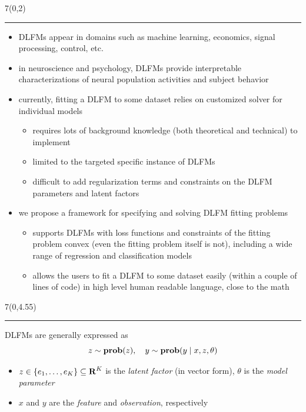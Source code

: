 \documentclass[a0]{a0poster}
\begin{document}
\begin{textblock}{7}(0,2)
    \hrule\vspace*{0.5\baselineskip}
    \begin{itemize}
        \item DLFMs appear in domains such as machine learning, economics, signal processing, control, etc.
        \item in neuroscience and psychology, DLFMs provide interpretable characterizations of neural population activities and subject behavior
        \item currently, fitting a DLFM to some dataset relies on customized solver for individual models
            \begin{itemize}
                \item requires lots of background knowledge (both theoretical and technical) to implement
                \item limited to the targeted specific instance of DLFMs
                \item difficult to add regularization terms and constraints on the DLFM parameters and latent factors
            \end{itemize}
        \item we propose a framework for specifying and solving DLFM fitting problems
            \begin{itemize}
                \item supports DLFMs with loss functions and constraints of the fitting problem convex (even the fitting problem itself is not), including a wide range of regression and classification models
                \item allows the users to fit a DLFM to some dataset easily (within a couple of lines of code) in high level human readable language, close to the math
            \end{itemize}
    \end{itemize}
\end{textblock}

\begin{textblock}{7}(0,4.55)
    \hrule\vspace*{0.5\baselineskip}

    DLFMs are generally expressed as
    \[
        z \sim \mathop{\bf prob{}}(z),\quad
        y \sim \mathop{\bf prob{}}(y \mid x, z, \theta)
    \]
    \begin{itemize}
        \item $z \in \{e_1, \ldots, e_K\} \subseteq {\bf R{}}^K$ is the \emph{latent factor} (in vector form), $\theta$ is the \emph{model parameter}
        \item $x$ and $y$ are the \emph{feature} and \emph{observation}, respectively
    \end{itemize}
\end{textblock}
\end{document}
